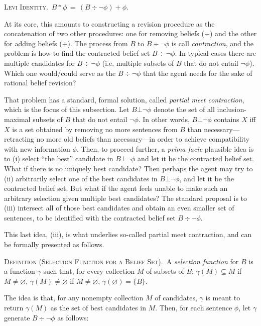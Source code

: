 	\xm \textsc{Levi Identity.}\, $B * \phi \,=\, (B \div \neg\phi) + \phi$. 

\ed At its core, this amounts to constructing a revision procedure as the concatenation of two other procedures: one for removing beliefs ($\div$) and the other for adding beliefs ($+$).  The process from $B$ to $B \div \neg\phi$ is call {\em contraction}, and the problem is how to find the contracted belief set $B \div \neg\phi$. In typical cases there are multiple candidates for $B \div \neg\phi$ (i.e. multiple subsets of $B$ that do not entail $\neg\phi$). Which one would/could serve as the $B \div \neg\phi$ that the agent needs for the sake of rational belief revision? 

That problem has a standard, formal solution, called {\em partial meet contraction}, which is the focus of this subsection. Let $B \bot \neg\phi$ denote the set of all inclusion-maximal subsets of $B$ that do not entail $\neg\phi$. In other words, $B \bot \neg\phi$ contains $X$ iff $X$ is a set obtained by removing no more sentences from $B$ than necessary---retracting no more old beliefs than necessary---in order to achieve compatibility with new information $\phi$. Then, to proceed further, a {\em prima facie} plausible idea is to (i) select ``the best'' candidate in $B \bot \neg\phi$ and let it be the contracted belief set.  What if there is no uniquely best candidate? Then perhaps the agent may try to (ii) arbitrarily select one of the best candidates in $B \bot \neg\phi$, and let it be the contracted belief set. But what if the agent feels unable to make such an arbitrary selection given multiple best candidates? The standard proposal is to (iii) intersect all of those best candidates and obtain an even smaller set of sentences, to be identified with the contracted belief set $B \div \neg\phi$.

This last idea, (iii), is what underlies so-called partial meet contraction, and can be formally presented as follows. \op

	\xm \textsc{Definition (Selection Function for a Belief Set).}\, A {\em selection function} for $B$ is a function $\gamma$ such that, for every collection $M$ of subsets of $B$: \op
		\im[(a)] $\gamma(M) \subseteq M$ if $M \neq \varnothing$,
		\im[(b)] $\gamma(M) \neq \varnothing$ if $M \neq \varnothing$,
		\im[(c)] $\gamma(\varnothing) = \{B\}$. 
	\ed

\ed The idea is that, for any nonempty collection $M$ of candidates, $\gamma$ is meant to return $\gamma(M)$ as the set of best candidates in $M$. Then, for each sentence $\phi$, let $\gamma$ generate $B \div \neg \phi$ as follows:\op

